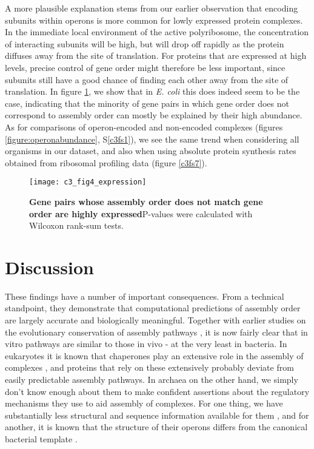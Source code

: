 \documentclass[a4paper,11pt,twoside,openright]{scrbook}
\begin{document}
A more plausible explanation stems from our earlier observation that encoding subunits within operons is more common for lowly expressed protein complexes. In the immediate local environment of the active polyribosome, the concentration of interacting subunits will be high, but will drop off rapidly as the protein diffuses away from the site of translation. For proteins that are expressed at high levels, precise control of gene order might therefore be less important, since subunits still have a good chance of finding each other away from the site of translation. In figure \ref{c3f4}, we show that in \textit{E. coli} this does indeed seem to be the case, indicating that the minority of gene pairs in which gene order does not correspond to assembly order can mostly be explained by their high abundance. As for comparisons of operon-encoded and non-encoded complexes (figures \ref{figure:operonabundance}, S\ref{c3fs1}), we see the same trend when considering all organisms in our dataset, and also when using absolute protein synthesis rates obtained from ribosomal profiling data (figure \ref{c3fs7}).

\begin{figure}[h]
\fcapsideright
    {\caption[Gene pairs whose assembly order does not match gene order are highly expressed]{\sffamily\textbf{Gene pairs whose assembly order does not match gene order are highly expressed}\newline \small P-values were calculated with Wilcoxon rank-sum tests.}\label{c3f4}}
    {\texttt{[image: c3\_fig4\_expression]}}
\end{figure}

\section{Discussion}
These findings have a number of important consequences. From a technical standpoint, they demonstrate that computational predictions of assembly order are largely accurate and biologically meaningful. Together with earlier studies on the evolutionary conservation of assembly pathways \cite{Levy2008,Marsh2013}, it is now fairly clear that in vitro pathways are similar to those in vivo - at the very least in bacteria. In eukaryotes it is known that chaperones play an extensive role in the assembly of complexes \cite{Ellis2006}, and proteins that rely on these extensively probably deviate from easily predictable assembly pathways. In archaea on the other hand, we simply don't know enough about them to make confident assertions about the regulatory mechanisms they use to aid assembly of complexes. For one thing, we have substantially less structural and sequence information available for them \cite{Mukherjee2017}, and for another, it is known that the structure of their operons differs from the canonical bacterial template \cite{Koide2009}.
\end{document}
